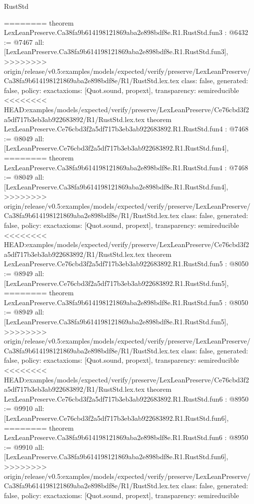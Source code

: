 \begin{lexlean}{RustStd}
\begin{coremodule}
{\begin{coremodule}
{{{{{{========
theorem LexLeanPreserve.Ca38fa9b614198121869aba2e898bdf8e.R1.RustStd.fun3 : @6432 := @7467 {
  all: [LexLeanPreserve.Ca38fa9b614198121869aba2e898bdf8e.R1.RustStd.fun3],
>>>>>>>> origin/release/v0.5:examples/models/expected/verify/preserve/LexLeanPreserve/Ca38fa9b614198121869aba2e898bdf8e/R1/RustStd.lex.tex
  class: false,
  generated: false,
  policy: exact{axioms: [Quot.sound, propext]},
  transparency: semireducible
}
<<<<<<<< HEAD:examples/models/expected/verify/preserve/LexLeanPreserve/Ce76cbd3f2a5df717b3eb3ab922683892/R1/RustStd.lex.tex
theorem LexLeanPreserve.Ce76cbd3f2a5df717b3eb3ab922683892.R1.RustStd.fun4 : @7468 := @8049 {
  all: [LexLeanPreserve.Ce76cbd3f2a5df717b3eb3ab922683892.R1.RustStd.fun4],
========
theorem LexLeanPreserve.Ca38fa9b614198121869aba2e898bdf8e.R1.RustStd.fun4 : @7468 := @8049 {
  all: [LexLeanPreserve.Ca38fa9b614198121869aba2e898bdf8e.R1.RustStd.fun4],
>>>>>>>> origin/release/v0.5:examples/models/expected/verify/preserve/LexLeanPreserve/Ca38fa9b614198121869aba2e898bdf8e/R1/RustStd.lex.tex
  class: false,
  generated: false,
  policy: exact{axioms: [Quot.sound, propext]},
  transparency: semireducible
}
<<<<<<<< HEAD:examples/models/expected/verify/preserve/LexLeanPreserve/Ce76cbd3f2a5df717b3eb3ab922683892/R1/RustStd.lex.tex
theorem LexLeanPreserve.Ce76cbd3f2a5df717b3eb3ab922683892.R1.RustStd.fun5 : @8050 := @8949 {
  all: [LexLeanPreserve.Ce76cbd3f2a5df717b3eb3ab922683892.R1.RustStd.fun5],
========
theorem LexLeanPreserve.Ca38fa9b614198121869aba2e898bdf8e.R1.RustStd.fun5 : @8050 := @8949 {
  all: [LexLeanPreserve.Ca38fa9b614198121869aba2e898bdf8e.R1.RustStd.fun5],
>>>>>>>> origin/release/v0.5:examples/models/expected/verify/preserve/LexLeanPreserve/Ca38fa9b614198121869aba2e898bdf8e/R1/RustStd.lex.tex
  class: false,
  generated: false,
  policy: exact{axioms: [Quot.sound, propext]},
  transparency: semireducible
}
<<<<<<<< HEAD:examples/models/expected/verify/preserve/LexLeanPreserve/Ce76cbd3f2a5df717b3eb3ab922683892/R1/RustStd.lex.tex
theorem LexLeanPreserve.Ce76cbd3f2a5df717b3eb3ab922683892.R1.RustStd.fun6 : @8950 := @9910 {
  all: [LexLeanPreserve.Ce76cbd3f2a5df717b3eb3ab922683892.R1.RustStd.fun6],
========
theorem LexLeanPreserve.Ca38fa9b614198121869aba2e898bdf8e.R1.RustStd.fun6 : @8950 := @9910 {
  all: [LexLeanPreserve.Ca38fa9b614198121869aba2e898bdf8e.R1.RustStd.fun6],
>>>>>>>> origin/release/v0.5:examples/models/expected/verify/preserve/LexLeanPreserve/Ca38fa9b614198121869aba2e898bdf8e/R1/RustStd.lex.tex
  class: false,
  generated: false,
  policy: exact{axioms: [Quot.sound, propext]},
  transparency: semireducible
}}}}}}}}}}
\end{coremodule}}
\end{coremodule}
\end{lexlean}
